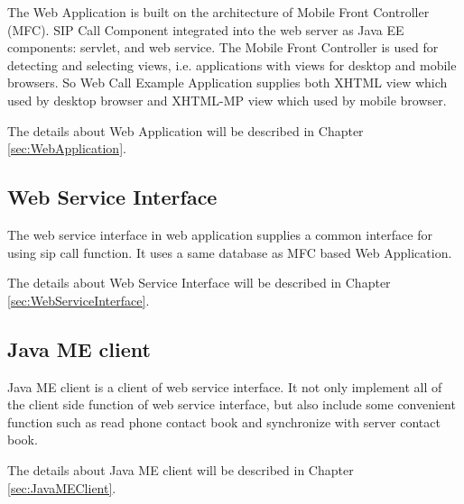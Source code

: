 The Web Application is built on the architecture of Mobile Front Controller (MFC). SIP Call Component integrated into the web server as Java EE components: servlet, and web service. The Mobile Front Controller is used for detecting and selecting views, i.e. applications with views for desktop and mobile browsers. So Web Call Example Application supplies both XHTML view which used by desktop browser and XHTML-MP view which used by mobile browser. 

The details about Web Application will be described in Chapter \ref{sec:WebApplication}.

\subsection{Web Service Interface}

The web service interface in web application supplies a common interface for using sip call function. It uses a same database as MFC based Web Application.

The details about Web Service Interface will be described in Chapter \ref{sec:WebServiceInterface}.

\subsection{Java ME client}

Java ME client is a client of web service interface. It not only implement all of the client side function of web service interface, but also include some convenient function such as read phone contact book and synchronize with server contact book.

The details about Java ME client will be described in Chapter \ref{sec:JavaMEClient}.







